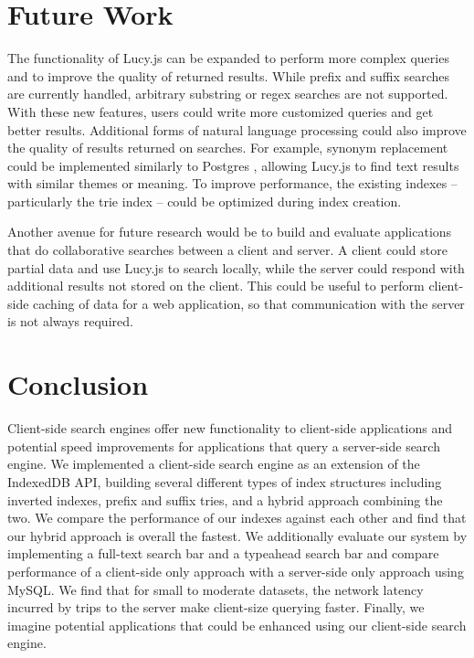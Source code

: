 \documentclass{vldb}
\begin{document}
\section{Future Work}
The functionality of Lucy.js can be expanded to perform more complex queries and to improve the quality of returned results. While prefix and suffix searches are currently handled, arbitrary substring or regex searches are not supported. With these new features, users could write more customized queries and get better results. Additional forms of natural language processing could also improve the quality of results returned on searches. For example, synonym replacement could be implemented similarly to Postgres , allowing Lucy.js to find text results with similar themes or meaning. To improve performance, the existing indexes -- particularly the trie index -- could be optimized during index creation.

Another avenue for future research would be to build and evaluate applications that do collaborative searches between a client and server. A client could store partial data and use Lucy.js to search locally, while the server could respond with additional results not stored on the client. This could be useful to perform client-side caching of data for a web application, so that communication with the server is not always required.

\section{Conclusion}

Client-side search engines offer new functionality to client-side applications and potential speed improvements for applications that query a server-side search engine. We implemented a client-side search engine as an extension of the IndexedDB API, building several different types of index structures including inverted indexes, prefix and suffix tries, and a hybrid approach combining the two. We compare the performance of our indexes against each other and find that our hybrid approach is overall the fastest. We additionally evaluate our system by implementing a full-text search bar and a typeahead search bar and compare performance of a client-side only approach with a server-side only approach using MySQL. We find that for small to moderate datasets, the network latency incurred by trips to the server make client-size querying faster. Finally, we imagine potential applications that could be enhanced using our client-side search engine.



\end{document}
